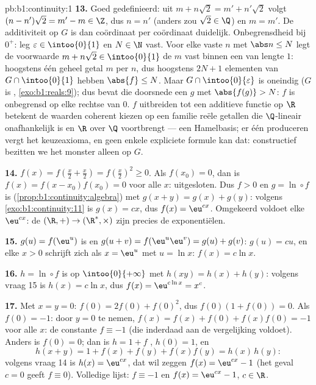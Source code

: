 \begin{solution}{pb:b1:continuity:1}
\textbf{13.} Goed gedefinieerd: uit $m + n\sqrt2 = m' + n'\sqrt2$
volgt $(n - n')\sqrt2 = m' - m \in \Z$, dus $n = n'$ (anders zou
$\sqrt2 \in \Q$) en $m = m'$. De additiviteit op $G$ is dan
coördinaat per coördinaat duidelijk. Onbegrensdheid bij $0^+$: leg
$\varepsilon \in \intoo{0}{1}$ en $N \in \N$ vast. Voor elke vaste
$n$ met $\abs n \leq N$ legt de voorwaarde $m + n\sqrt2 \in
\intoo{0}{1}$ de $m$ vast binnen een  van lengte $1$:
hoogstens één geheel getal $m$ per $n$, dus hoogstens $2N + 1$
elementen van $G \cap \intoo{0}{1}$ hebben $\abs{f} \leq N$. Maar $G
\cap \intoo{0}{\varepsilon}$ is oneindig ($G$ is ,
\cref{exo:b1:reals:9}); dus bevat die doorsnede een $g$ met
$\abs{f(g)} > N$: $f$ is onbegrensd op elke rechtse  van
$0$. $f$ uitbreiden tot een additieve functie op $\R$ betekent de
waarden coherent kiezen op een familie reële getallen die
$\Q$-lineair onafhankelijk is en $\R$ over $\Q$ voortbrengt --- een
Hamelbasis; er één produceren vergt het keuzeaxioma, en geen enkele
expliciete formule kan dat: constructief bezitten we het monster
alleen op $G$.

\textbf{14.} $f(x) = f(\frac x2 + \frac x2) = f(\frac x2)^2 \geq 0$.
Als $f(x_0) = 0$, dan is $f(x) = f(x - x_0)f(x_0) = 0$ voor alle
$x$: uitgesloten. Dus $f > 0$ en $g = \ln \circ f$ is 
(\cref{prop:b1:continuity:algebra}) met $g(x + y) = g(x) + g(y)$:
volgens \cref{exo:b1:continuity:11} is $g(x) = cx$, dus $f(x) =
\eu^{cx}$. Omgekeerd voldoet elke $\eu^{cx}$: de  
$(\R, +) \to (\R^*, \times)$ zijn precies de exponentiëlen.

\textbf{15.} $g(u) = f(\eu^u)$ is  en $g(u + v) = f(\eu^u
\eu^v) = g(u) + g(v)$: $g(u) = cu$, en elke $x > 0$ schrijft zich
als $x = \eu^u$ met $u = \ln x$: $f(x) = c\ln x$.

\textbf{16.} $h = \ln \circ f$ is  op $\intoo{0}{+\infty}$
met $h(xy) = h(x) + h(y)$: volgens vraag 15 is $h(x) = c\ln x$, dus
$f(x) = \eu^{c\ln x} = x^c$.

\textbf{17.} Met $x = y = 0$: $f(0) = 2f(0) + f(0)^2$, dus $f(0)(1 +
f(0)) = 0$. Als $f(0) = -1$: door $y = 0$ te nemen, $f(x) = f(x) +
f(0) + f(x)f(0) = -1$ voor alle $x$: de constante $f \equiv -1$ (die
inderdaad aan de vergelijking voldoet). Anders is $f(0) = 0$; dan is
$h = 1 + f$ , $h(0) = 1$, en
\[
h(x + y) = 1 + f(x) + f(y) + f(x)f(y) = h(x)\,h(y) :
\]
volgens vraag 14 is $h(x) = \eu^{cx}$, dat wil zeggen $f(x) =
\eu^{cx} - 1$ (het geval $c = 0$ geeft $f \equiv 0$). Volledige
lijst: $f \equiv -1$ en $f(x) = \eu^{cx} - 1$, $c \in \R$.


\end{solution}
